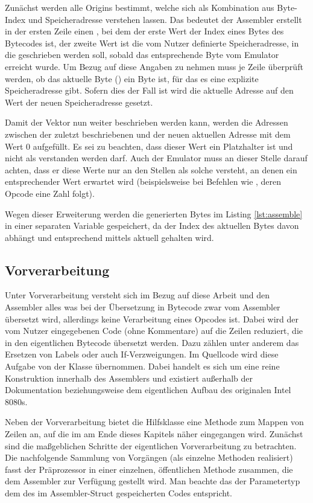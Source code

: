 Zunächst werden alle Origins bestimmt, welche sich als Kombination aus Byte-Index und Speicheradresse verstehen lassen. Das bedeutet der Assembler erstellt in der ersten Zeile einen , bei dem der erste Wert der Index eines Bytes des Bytecodes ist, der zweite Wert ist die vom Nutzer definierte Speicheradresse, in die geschrieben werden soll, sobald das entsprechende Byte vom Emulator erreicht wurde. Um Bezug auf diese Angaben zu nehmen muss je Zeile überprüft werden, ob das aktuelle Byte () ein Byte ist, für das es eine explizite Speicheradresse gibt. Sofern dies der Fall ist wird die aktuelle Adresse auf den Wert der neuen Speicheradresse gesetzt. 

Damit der Vektor nun weiter beschrieben werden kann, werden die Adressen zwischen der zuletzt beschriebenen und der neuen aktuellen Adresse mit dem Wert 0 aufgefüllt. Es sei zu beachten, dass dieser Wert ein Platzhalter ist und nicht als \grqq{} verstanden werden darf. Auch der Emulator muss an dieser Stelle darauf achten, dass er diese Werte nur an den Stellen als solche versteht, an denen ein entsprechender Wert erwartet wird (beispielsweise bei Befehlen wie , deren Opcode eine Zahl folgt).

Wegen dieser Erweiterung werden die generierten Bytes im Listing \ref{lst:assemble} in einer separaten Variable gespeichert, da der Index des aktuellen Bytes davon abhängt und entsprechend mittels
aktuell gehalten wird.

\subsection{Vorverarbeitung}\label{chap:preprocessor}

Unter Vorverarbeitung versteht sich im Bezug auf diese Arbeit und den Assembler alles was bei der Übersetzung in Bytecode zwar vom Assembler übersetzt wird, allerdings keine Verarbeitung eines Opcodes ist. Dabei wird der vom Nutzer eingegebenen Code (ohne Kommentare) auf die Zeilen reduziert, die in den eigentlichen Bytecode übersetzt werden. Dazu zählen unter anderem das Ersetzen von Labels oder auch If-Verzweigungen. Im Quellcode wird diese Aufgabe von der Klasse  übernommen. Dabei handelt es sich um eine reine Konstruktion innerhalb des Assemblers und existiert außerhalb der Dokumentation beziehungsweise dem eigentlichen Aufbau des originalen Intel 8080s.

Neben der Vorverarbeitung bietet die Hilfsklasse eine Methode zum Mappen von Zeilen an, auf die im am Ende dieses Kapitels näher eingegangen wird. Zunächst sind die maßgeblichen Schritte der eigentlichen Vorverarbeitung zu betrachten. Die nachfolgende Sammlung von Vorgängen (als einzelne Methoden realisiert) fasst der Präprozessor in einer einzelnen, öffentlichen Methode  zusammen, die dem Assembler zur Verfügung gestellt wird. Man beachte das der Parametertyp dem des im Assembler-Struct gespeicherten Codes entspricht.

